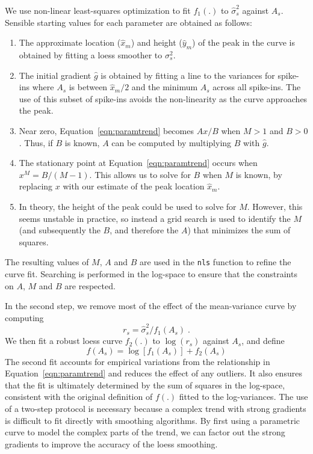 \documentclass{article}
\begin{document}
We use non-linear least-squares optimization to fit $f_1(.)$ to $\hat\sigma^2_s$ against $A_s$.
Sensible starting values for each parameter are obtained as follows:
\begin{enumerate}
\item The approximate location ($\hat{x}_m$) and height ($\hat{y}_m$) of the peak in the curve is obtained by fitting a loess smoother to $\sigma^2_s$.
\item The initial gradient $\hat{g}$ is obtained by fitting a line to the variances for spike-ins where $A_s$ is between $\hat{x}_m/2$ and the minimum $A_s$ across all spike-ins.
The use of this subset of spike-ins avoids the non-linearity as the curve approaches the peak.
\item Near zero, Equation~\ref{eqn:paramtrend} becomes $Ax/B$ when $M>1$ and $B>0$. 
Thus, if $B$ is known, $A$ can be computed by multiplying $B$ with $\hat{g}$.
\item The stationary point at Equation~\ref{eqn:paramtrend} occurs when $x^M = B/(M-1)$.
This allows us to solve for $B$ when $M$ is known, by replacing $x$ with our estimate of the peak location $\hat{x}_m$.
\item In theory, the height of the peak could be used to solve for $M$. 
However, this seems unstable in practice, so instead a grid search is used to identify the $M$ (and subsequently the $B$, and therefore the $A$) that minimizes the sum of squares.
\end{enumerate}
The resulting values of $M$, $A$ and $B$ are used in the \texttt{nls} function to refine the curve fit.
Searching is performed in the log-space to ensure that the constraints on $A$, $M$ and $B$ are respected.

In the second step, we remove most of the effect of the mean-variance curve by computing 
\[
    r_s = \hat\sigma^2_s/f_1(A_s) \;.
\]
We then fit a robust loess curve $f_2(.)$ to $\log(r_s)$ against $A_s$, and define
\[
    f(A_s) = \log[f_1(A_s)] + f_2(A_s)
\]
The second fit accounts for empirical variations from the relationship in Equation~\ref{eqn:paramtrend} and reduces the effect of any outliers.
It also ensures that the fit is ultimately determined by the sum of squares in the log-space, consistent with the original definition of $f(.)$ fitted to the log-variances.
The use of a two-step protocol is necessary because a complex trend with strong gradients is difficult to fit directly with smoothing algorithms.
By first using a parametric curve to model the complex parts of the trend, we can factor out the strong gradients to improve the accuracy of the loess smoothing.
\end{document}

